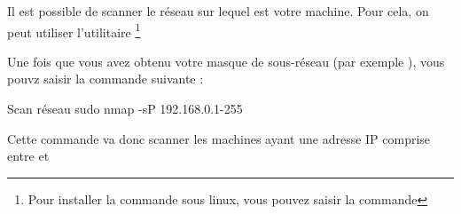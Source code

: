Il est possible de scanner le réseau sur lequel est votre machine.
Pour cela, on peut utiliser l'utilitaire \footnote{Pour installer la commande sous linux, vous pouvez saisir la commande }


Une fois que vous avez obtenu votre masque de sous-réseau (par exemple ), vous pouvz saisir la commande suivante : 


\begin{Bash}{Scan réseau}
sudo nmap -sP 192.168.0.1-255
\end{Bash}

Cette commande va donc scanner les machines ayant une adresse IP comprise entre  et 
